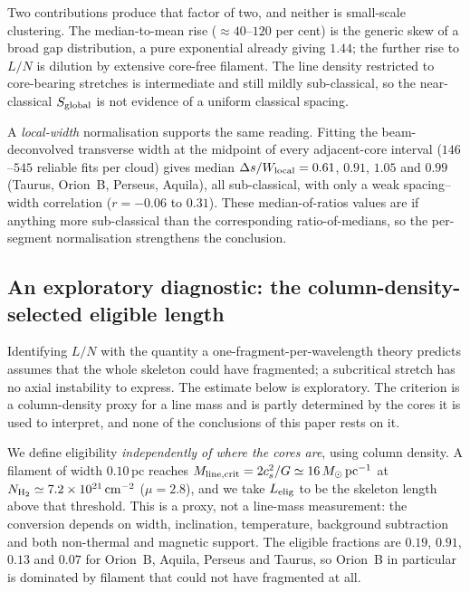 \documentclass[usenatbib,twoside,twocolumn]{mnras}
\begin{document}
Two contributions produce that factor of two, and neither is small-scale clustering. The median-to-mean rise ($\approx40$--$120$ per cent) is the generic skew of a broad gap distribution, a pure exponential already giving $1.44$; the further rise to $L/N$ is dilution by extensive core-free filament. The line density restricted to core-bearing stretches is intermediate and still mildly sub-classical, so the near-classical $S_{\rm global}$ is not evidence of a uniform classical spacing.

A \emph{local-width} normalisation supports the same reading. Fitting the beam-deconvolved transverse width at the midpoint of every adjacent-core interval ($146$--$545$ reliable fits per cloud) gives median $\Delta s/W_{\rm local}=0.61$, $0.91$, $1.05$ and $0.99$ (Taurus, Orion~B, Perseus, Aquila), all sub-classical, with only a weak spacing--width correlation ($r=-0.06$ to $0.31$). These median-of-ratios values are if anything more sub-classical than the corresponding ratio-of-medians, so the per-segment normalisation strengthens the conclusion.



\subsection{An exploratory diagnostic: the column-density-selected eligible length}
\label{sec:eligible}

Identifying $L/N$ with the quantity a one-fragment-per-wavelength theory predicts assumes that the whole skeleton could have fragmented; a subcritical stretch has no axial instability to express. The estimate below is exploratory. The criterion is a column-density proxy for a line mass and is partly determined by the cores it is used to interpret, and none of the conclusions of this paper rests on it.

We define eligibility \emph{independently of where the cores are}, using column density. A filament of width $0.10$\,pc reaches $M_{\rm line,crit}=2c_s^2/G\simeq16\,M_\odot\,{\rm pc^{-1}}$ at $N_{\rm H_2}\simeq7.2\times10^{21}\,{\rm cm^{-2}}$ ($\mu=2.8$), and we take $L_{\rm elig}$ to be the skeleton length above that threshold. This is a proxy, not a line-mass measurement: the conversion depends on width, inclination, temperature, background subtraction and both non-thermal and magnetic support. The eligible fractions are $0.19$, $0.91$, $0.13$ and $0.07$ for Orion~B, Aquila, Perseus and Taurus, so Orion~B in particular is dominated by filament that could not have fragmented at all.
\end{document}
